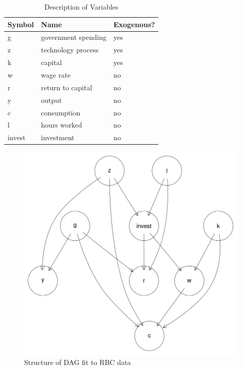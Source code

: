 \documentclass{article}
\begin{document}
\begin{table}
\centering
\begin{tabular}{|l|l|l|}
  \hline
  Symbol & Name & Exogenous? \\
  \hline
  g & government spending & yes \\
  z & technology process & yes \\
  k & capital & yes \\
  w & wage rate & no \\
  r & return to capital & no \\
  y & output & no \\
  c & consumption & no \\
  l & hours worked & no \\
  invest & investment & no \\ \cline{2-2}
  \hline
\end{tabular}
\caption{Description of Variables}
\label{tab1}
\end{table}

\begin{figure}
\centering
\label{rbcdag}
\includegraphics[width=\textwidth, height=0.4\textheight, keepaspectratio]{images/rbc_baseline_model.png}
\caption{Structure of DAG fit to RBC data}
\end{figure}
\end{document}
